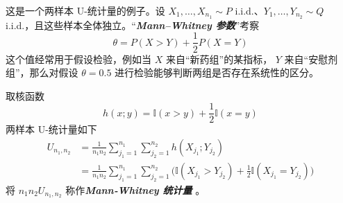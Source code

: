 \begin{example}
这是一个两样本 U-统计量的例子。设 $X_1,\ldots,X_{n_1}\sim P$ i.i.d.、$Y_1,\ldots,Y_{n_2}\sim Q$ i.i.d.，且这些样本全体独立。``\textbf{\emph{Mann--Whitney 参数}}''考察 
$$\theta=P(X>Y)+\frac12 P(X=Y)$$
这个值经常用于假设检验，例如当 $X$ 来自``新药组''的某指标， $Y$ 来自``安慰剂组''，那么对假设 $\theta=0.5$ 进行检验能够判断两组是否存在系统性的区分。

取核函数 \[ h(x;y)=\mathbb I(x>y)+\frac12\mathbb I(x=y) \]两样本 U-统计量如下
\[\begin{aligned} U_{n_1,n_2}&=\frac1{n_1n_2}\sum_{j_1=1}^{n_1}\sum_{j_2=1}^{n_2}h(X_{j_1};Y_{j_2})\\ &=\frac1{n_1n_2}\sum_{j_1=1}^{n_1}\sum_{j_2=1}^{n_2}\Big(\mathbb I(X_{j_1}>Y_{j_2})+\frac12\mathbb I(X_{j_1}=Y_{j_2})\Big) \end{aligned}\]
将 $n_1n_2U_{n_1,n_2}$ 称作\textbf{\emph{Mann‑Whitney 统计量}} 。

\end{example}
